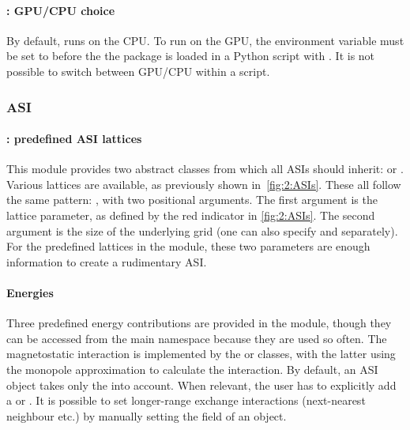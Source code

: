 \paragraph{: GPU/CPU choice}
By default, \hotspice runs on the CPU. To run on the GPU, the environment variable  must be set to  before the the \hotspice package is loaded in a Python script with . It is not possible to switch between GPU/CPU within a script.
\subsubsection{ASI}
\paragraph{: predefined ASI lattices}
This module provides two abstract classes from which all ASIs should inherit:  or .
Various lattices are available, as previously shown in~\cref{fig:2:ASIs}.
These all follow the same pattern: , with two positional arguments.
The first argument is the lattice parameter, as defined by the red indicator in \cref{fig:2:ASIs}.
The second argument is the size of the underlying grid (one can also specify  and  separately).
For the predefined lattices in the  module, these two parameters are enough information to create a rudimentary ASI.
\paragraph{Energies}\label{sec:2:API_energies}
Three predefined energy contributions are provided in the  module, though they can be accessed from the main  namespace because they are used so often.
The magnetostatic interaction is implemented by the  or  classes, with the latter using the monopole approximation to calculate the interaction.
By default, an ASI object takes only the  into account.
When relevant, the user has to explicitly add a  or .
It is possible to set longer-range exchange interactions (next-nearest neighbour etc.) by manually setting the  field of an  object.
